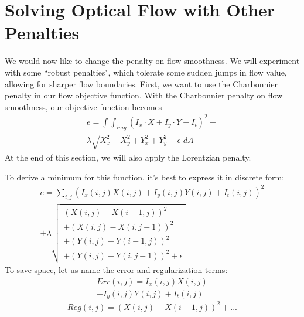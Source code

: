 \documentclass[10pt,twocolumn,letterpaper]{article}
\begin{document}
\section{Solving Optical Flow with Other Penalties}
We would now like to change the penalty on flow smoothness.  We will experiment with some ``robust penalties", which tolerate some sudden jumps in flow value, allowing for sharper flow boundaries.  First, we want to use the Charbonnier penalty in our flow objective function.  With the Charbonnier penalty on flow smoothness, our objective function becomes
\begin{multline} \label{eq:objectivec}
e = \int \int_{img} (I_x \cdot X + I_y \cdot Y + I_t)^2 + \\
\lambda \sqrt{X_x^2 + X_y^2 + Y_x^2 + Y_y^2 + \epsilon} \; dA 
\end{multline}
At the end of this section, we will also apply the Lorentzian penalty.

To derive a minimum for this function, it's best to express it in discrete form:
\begin{multline} \label{eq:objectivecDiscrete}
e = \sum_{i,j} (I_x(i, j) X(i, j) + I_y(i, j) Y(i, j) + I_t(i, j))^2 \\
+ \lambda \sqrt{
\begin{array}{c}
(X(i, j) - X(i-1, j))^2 \\
+ (X(i,j) - X(i,j-1))^2 \\
+ (Y(i,j) - Y(i-1, j))^2 \\
+ (Y(i,j) - Y(i,j-1))^2 + \epsilon
\end{array}
}
\end{multline}
To save space, let us name the error and regularization terms:
\begin{multline} \label{eq:errorTerm}
Err(i, j) = I_x(i, j) X(i, j) \\
+ I_y(i, j) Y(i, j) + I_t(i, j)
\end{multline}
\begin{equation} \label{eq:regTerm}
Reg(i,j) = (X(i,j) - X(i-1,j))^2 + ...
\end{equation}
\end{document}
